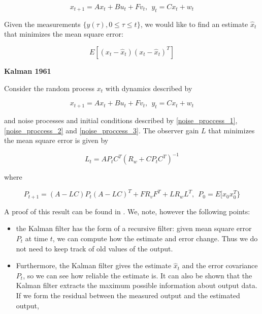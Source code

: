 \begin{equation}
x_{t+1} = Ax_t + Bu_t + Fv_t,  ~~ y_t = Cx_t + w_t 
\end{equation}

Given the measurements $\{y(\tau), 0 \leq \tau \leq t \}$, we would like to find an estimate $\hat{x}_t$ that minimizes the mean square error:

\begin{equation}
E[(x_t - \hat{x}_t)(x_t - \hat{x}_t)^T] 
\end{equation}

\begin{framed}
\theoremstyle{theorem}
\begin{theorem}{\textbf{Kalman 1961}}


Consider the random process $x_t$ with dynamics described by  

\begin{equation}
x_{t+1} = Ax_t + Bu_t + Fv_t,  ~~ y_t = Cx_t + w_t \nonumber
\end{equation} 

and noise processes and initial conditions described by \ref{noise_proccess_1},  \ref{noise_proccess_2} and 
\ref{noise_proccess_3}. The observer gain $L$ that minimizes the mean square error is given by  

\begin{equation}
L_t = AP_tC^T(R_w + CP_tC^T)^{-1}  \nonumber
\end{equation}

where

\begin{equation}
P_{t+1} =  (A − LC)P_t(A − LC)^T + FR_v F^T + LR_w L^T, ~~ P_0 = E[x_0x^{T}_0\}
\end{equation}

\end{theorem}
\end{framed}

A proof of this result can be found in \cite{Astrom}. We, note, however the following points:

\begin{itemize}
\item the Kalman filter has the form of a recursive filter: given mean square error $P_t$ at time $t$, we can compute how the estimate and error change. Thus we do not need to keep track of old values of the output.
\item Furthermore, the Kalman filter gives the estimate $\hat{x}_t$ and the error covariance $P_t$, so we can see how reliable the estimate is. It can also be shown that the Kalman filter extracts the maximum possible information about output data. If we form the residual between the measured output and the estimated output,


\end{itemize}
